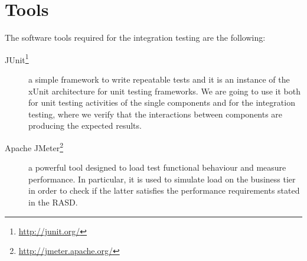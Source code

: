 \section{Tools}
The software tools required for the integration testing are the following:

\begin{description}

    \item[JUnit\footnote{\url{http://junit.org/}}]
    a simple framework to write repeatable tests and it is an instance of the xUnit architecture for unit testing frameworks.
    We are going to use it both for unit testing activities of the single components and for the integration testing, where we verify that the interactions between components are producing the expected results.
    

    \item[Apache JMeter\footnote{\url{http://jmeter.apache.org/}}]
    a powerful tool designed to load test functional behaviour and measure performance.
    In particular, it is used to simulate load on the business tier in order to check if the latter satisfies the performance requirements stated in the RASD.

\end{description}

